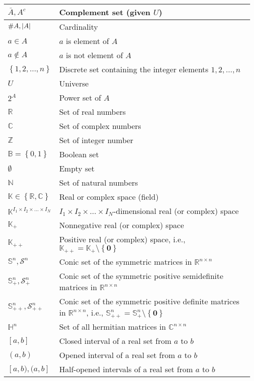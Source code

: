 \documentclass{article}
\begin{document}
\begin{xltabular}{\textwidth}{XX}
    \(\bar{A}, A^{c}\) & Complement set (given $U$)\\ \hline
    \(\#A, \abs{A}\) & Cardinality\\ \hline
    \(a \in A\)& \(a\) is element of \(A\) \\ \hline
    \(a \notin A\)& \(a\) is not element of \(A\) \\ \hline
    \(\left\{ 1,2, \dots, n \right\}\) & Discrete set containing the integer elements \(1,2, \dots, n\)\\ \hline
    \(U\) & Universe\\ \hline
    \(2^A\) & Power set of \(A\)\\ \hline
    \(\mathbb{R}\) & Set of real numbers\\ \hline
    \(\mathbb{C}\)& Set of complex numbers\\ \hline
    \(\mathbb{Z}\) & Set of integer number\\ \hline
    \(\mathbb{B} = \left\{ 0, 1 \right\}\) & Boolean set\\ \hline %
    \(\emptyset\) & Empty set\\ \hline
    \(\mathbb{N}\) & Set of natural numbers\\ \hline
    \(\mathbb{K} \in \left\{ \mathbb{R}, \mathbb{C} \right\}\) & Real or complex space (field)\\ \hline
    \(\mathbb{K}^{I_1\times I_2 \times \dots \times I_N}\) & \(I_1\times I_2 \times \dots \times I_N\)-dimensional real (or complex) space\\ \hline
    \(\mathbb{K}_{+}\) & Nonnegative real (or complex) space \cite{boydConvexOptimization2004}\\ \hline
    \(\mathbb{K}_{++}\) & Positive real (or complex) space, i.e., \(\mathbb{K}_{++} = \mathbb{K}_{+}\setminus\left\{ \mathbf{0} \right\}\) \cite{boydConvexOptimization2004}\\ \hline
    \(\mathbb{S}^{n}, \mathcal{S}^{n}\) & Conic set of the symmetric matrices in \(\mathbb{R}^{n\times n}\) \cite{boydConvexOptimization2004}\\ \hline
    \(\mathbb{S}_{+}^{n}, \mathcal{S}_{+}^{n}\) & Conic set of the symmetric positive semidefinite matrices in \(\mathbb{R}^{n\times n}\) \cite{boydConvexOptimization2004}\\ \hline
    \(\mathbb{S}_{++}^{n}, \mathcal{S}_{++}^{n}\) & Conic set of the symmetric positive definite matrices in \(\mathbb{R}^{n\times n}\), i.e., \(\mathbb{S}_{++}^{n} = \mathbb{S}_{+}^{n}\setminus \left\{ \mathbf{0} \right\}\) \cite{boydConvexOptimization2004}\\ \hline
    \(\mathbb{H}^{n}\) & Set of all hermitian matrices in \(\mathbb{C}^{n\times n}\)\\ \hline
    \([a, b]\) & Closed interval of a real set from \(a\) to \(b\)\\ \hline
    \((a, b)\) & Opened interval of a real set from \(a\) to \(b\)\\ \hline
    \([a, b), (a, b]\) & Half-opened intervals of a real set from \(a\) to \(b\)\\
\end{xltabular}
\end{document}

